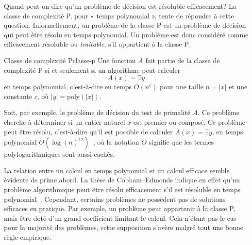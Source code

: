 
Quand peut-on dire qu'un problème de décision est résoluble efficacement? La classe de complexité \textsf{P}, pour « temps polynomial », tente de répondre à cette question. Informellement, un problème de la classe \textsf{P} est un problème de décision qui peut être résolu en temps polynomial. Un problème est donc considéré comme efficacement résoluble ou \textit{traitable}, s'il appartient à la classe \textsf{P}. 

\begin{maindefinition}{Classe de complexité \textsf{P}}{classe-p}
    Une fonction $A$ fait partie de la classe de complexité \textsf{P} si et seulement si un algorithme peut calculer 
    \begin{equation*}
        A(x)=\exists y
    \end{equation*}
    en temps polynomial, c’est-à-dire en temps $O(n^{c})$ pour une taille $n = \lvert x \rvert$ et une constante $c$, où $\lvert y \rvert = \mathrm{poly}(\lvert x \rvert )$.
\end{maindefinition}

Soit, par exemple, le problème de décision du test de primalité $A$. Ce problème cherche à déterminer si un entier naturel $x$ est premier ou composé. Ce problème peut être résolu, c'est-à-dire qu'il est possible de calculer $A(x)=\exists y$, en temps polynomial $\tilde{O}(\log(n)^{12})$~\cite{PRIMESAnnalsMathematics}, où la notation $\tilde{O}$ signifie que les termes polylogarithmiques sont aussi cachés. 

La relation entre un calcul en temps polynomial et un calcul efficace semble évidente de prime abord. La thèse de Cobham–Edmonds indique en effet qu'un problème algorithmique peut être résolu efficacement s'il est résoluble en temps polynomial~\cite{cobhamIntrinsicComputationalDifficulty1965, edmondsPathsTreesFlowers1965}. Cependant, certains problèmes ne possèdent pas de solutions efficaces en pratique. Par exemple, un problème peut appartenir à la classe \textsf{P}, mais être doté d'un grand coefficient limitant le calcul. Cela n'étant pas le cas pour la majorité des problèmes, cette supposition s'avère malgré tout une bonne règle empirique. 

